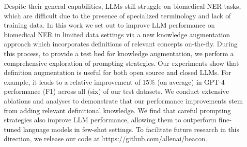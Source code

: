 Despite their general capabilities, LLMs still struggle on biomedical NER tasks, which are difficult due to the presence of specialized terminology and lack of training data.  In this work we set out to improve LLM performance on biomedical NER in limited data settings via a new knowledge augmentation approach which incorporates definitions of relevant concepts on-the-fly.  During this process, to provide a test bed for knowledge augmentation, we perform a comprehensive exploration of prompting strategies.  Our experiments show that definition augmentation is useful for both open source and closed LLMs. For example, it leads to a relative improvement of 15\% (on average) in GPT-4 performance (F1) across all (six) of our test datasets.  We conduct extensive ablations and analyses to demonstrate that our performance improvements stem from adding relevant definitional knowledge.  We find that careful prompting strategies also improve LLM performance, allowing them to outperform fine-tuned language models in few-shot settings.   To facilitate future research in this direction, we release our code at https://github.com/allenai/beacon.
